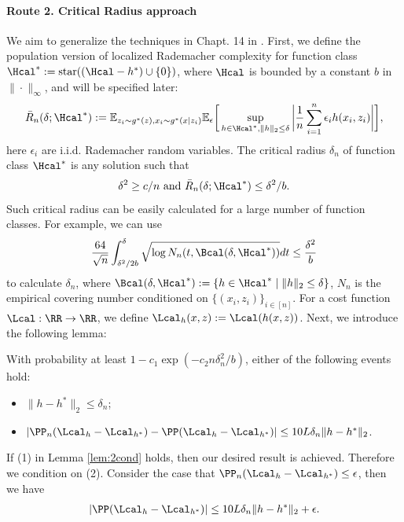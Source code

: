 \documentclass[12pt]{extarticle} %
\newcommand{\E}{\mathbb{E}}
\begin{document}
\paragraph{Route 2. Critical Radius approach }
We aim to generalize the techniques in Chapt. 14 in \cite{wainwright2019high}. First, we define the population version of localized Rademacher complexity for function class $\Hcal^* := \operatorname{star}((\Hcal - h^*) \cup \{0\})$, where $\Hcal$ is bounded by a constant $b$ in $\|\cdot\|_\infty$, and will be specified later:
$$
\bar{R}_n (\delta; \Hcal^*) := \E_{z_i\sim g^*(z), x_i\sim g^*(x\mid z_i)} \E_\epsilon\bigg[\sup_{h\in \Hcal^*, \|h\|_2 \leq \delta} \bigg|\frac{1}{n}\sum_{i=1}^n \epsilon_i h(x_i, z_i)\bigg|\bigg],
$$
here $\epsilon_i$ are i.i.d. Rademacher random variables. The critical radius $\delta_n$ of function class $\Hcal^*$ is any solution such that \begin{align*}
    \delta^2 \geq c/n \text{ and }\bar{R}_n (\delta; \Hcal^*)\leq \delta^2/b.
\end{align*}
Such critical radius can be easily calculated for a large number of function classes. For example, we can use $$
\frac{64}{\sqrt{n}}\int_{\delta^2/2b}^{\delta}\sqrt{\log N_n(t, \Bcal(\delta,\Hcal^*))}dt \leq \frac{\delta^2}{b}
$$
to calculate $\delta_n$, where $\Bcal(\delta,\Hcal^*) := \{h\in\Hcal^*\mid \|h\|_2\leq \delta\}$, $N_n$ is the empirical covering number conditioned on $\{(x_i,z_i)\}_{i\in[n]}$.
For a cost function $\Lcal : \RR \rightarrow \RR$, we define $\Lcal_h(x,z):= \Lcal(h(x,z))$.
Next, we introduce the following lemma: 
\begin{lemma}\label{lem:2cond}
    With probability at least $1 - c_1 \exp(-c_2 n\delta_n^2/b)$, either of the following events hold: \begin{itemize}
        \item[(1)] $\|h - h^*\|_2\leq \delta_n$;
        \item[(2)] $|\PP_n (\Lcal_h - \Lcal_{h^*} ) -\PP (\Lcal_h - \Lcal_{h^*} ) | \leq 10L\delta_n\| h - h^*\|_2$.
    \end{itemize}
\end{lemma}
If  (1) in Lemma \ref{lem:2cond} holds, then our desired result is achieved. Therefore we condition on (2). Consider the case that $\PP_n(\Lcal_h - \Lcal_{h^*}) \leq \epsilon$, then we have \begin{align*}
    |\PP (\Lcal_h - \Lcal_{h^*} )| \leq 10L\delta_n\| h - h^*\|_2 + \epsilon.
\end{align*}
\end{document}

